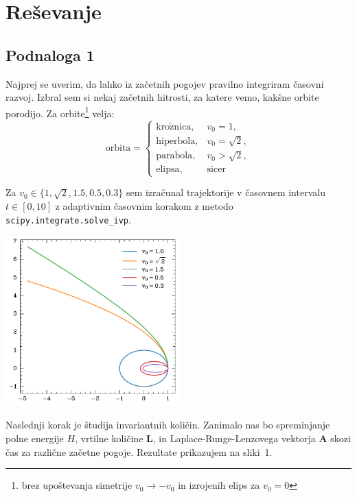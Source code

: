 \section{Reševanje}
\subsection{Podnaloga 1}
Najprej se uverim, da lahko iz začetnih pogojev pravilno integriram časovni razvoj. Izbral sem si nekaj začetnih hitrosti, za katere vemo, kakšne orbite porodijo. Za orbite\footnote{brez upoštevanja simetrije $v_0 \rightarrow - v_0$  in izrojenih elips za $v_0 = 0$} velja:
\[
    \mathrm{orbita}=\begin{cases}
        \mathrm{kro\check{z}nica}, & v_0 = 1,        \\
        \mathrm{hiperbola},        & v_0 = \sqrt{2}, \\
        \mathrm{parabola},         & v_0 > \sqrt{2}, \\
        \mathrm{elipsa},           & \mathrm{sicer}
    \end{cases}
\]

Za \(v_0 \in \{ 1, \sqrt{2}, 1.5, 0.5, 0.3 \}\) sem izračunal trajektorije v časovnem intervalu $ t\in\left[ 0, 10\right] $ z adaptivnim časovnim korakom z metodo \texttt{scipy.integrate.solve\_ivp}.

\begin{center}
    \centering
    \includegraphics[width=0.5\textwidth]{../images/1-1-v0.pdf}
\end{center}

Naslednji korak je študija invariantnih količin. Zanimalo nas bo spreminjanje polne energije $H$, vrtilne količine $\mathbf{L}$,  in Laplace-Runge-Lenzovega vektorja $\mathbf{A}$ skozi čas za različne začetne pogoje. Rezultate prikazujem na sliki~1.

